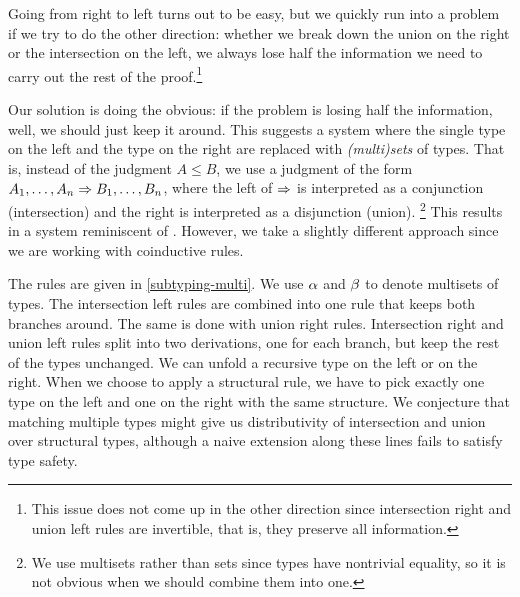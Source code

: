 \documentclass[submission,copyright,creativecommons]{eptcs}
\begin{document}
Going from right to left turns out to be easy, but we quickly run into a problem if we try to do the other direction: whether we break down the union on the right or the intersection on the left, we always lose half the information we need to carry out the rest of the proof.\footnote{This issue does not come up in the other direction since intersection right and union left rules are invertible, that is, they preserve all information.}

Our solution is doing the obvious: if the problem is losing half the information, well, we should just keep it around. This suggests a system where the single type on the left and the type on the right are replaced with \emph{(multi)sets} of types. That is, instead of the judgment $A \le B$, we use a judgment of the form $A_1, \ldots, A_n \Rightarrow B_1, \ldots, B_n$, where the left of $\Rightarrow$ is interpreted as a conjunction (intersection) and the right is interpreted as a disjunction (union).%
\footnote{We use multisets rather than sets since types have nontrivial equality, so it is not obvious when we should combine them into one.
}
This results in a system reminiscent of \cite{Gentzen35, Girard87}. However, we take a slightly different approach since we are working with coinductive rules.

The rules are given in \autoref{subtyping-multi}. We use $\alpha$ and $\beta$ to denote multisets of types. The intersection left rules are combined into one rule that keeps both branches around. The same is done with union right rules. Intersection right and union left rules split into two derivations, one for each branch, but keep the rest of the types unchanged. We can unfold a recursive type on the left or on the right. When we choose to apply a structural rule, we have to pick exactly one type on the left and one on the right with the same structure. We conjecture that matching multiple types might give us distributivity of intersection and union over structural types, although a naive extension along these lines fails to satisfy type safety.
\end{document}
